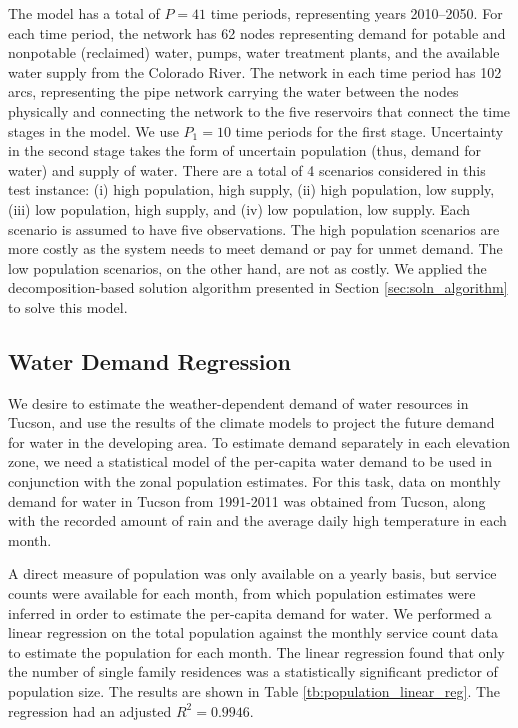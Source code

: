 \documentclass[opre,nonblindrev]{informs3} %
\begin{document}
The model has a total of $P = 41$ time periods, representing years 2010--2050.
For each time period, the network has 62 nodes representing demand for potable and nonpotable (reclaimed) water, pumps, water treatment plants, and the available water supply from the Colorado River.
The network in each time period has 102 arcs, representing the pipe network carrying the water between the nodes physically and connecting the network to the five reservoirs that connect the time stages in the model.
We use $P_1 = 10$ time periods for the first stage.
Uncertainty in the second stage takes the form of uncertain population (thus, demand for water) and supply of water.
There are a total of 4 scenarios considered in this test instance: (i) high population, high supply, (ii) high population, low supply, (iii) low population, high supply, and (iv) low population, low supply.
Each scenario is assumed to have five observations.
The high population scenarios are more costly as the system needs to meet demand or pay for unmet demand.
The low population scenarios, on the other hand, are not as costly.
We applied the decomposition-based solution algorithm presented in Section \ref{sec:soln_algorithm} to solve this model.

\subsection{Water Demand Regression}
\label{sec:model}

We desire to estimate the weather-dependent demand of water resources in Tucson, and use the results of the climate models to project the future demand for water in the developing area.
To estimate demand separately in each elevation zone, we need a statistical model of the per-capita water demand to be used in conjunction with the zonal population estimates.
For this task, data on monthly demand for water in Tucson from 1991-2011 was obtained from Tucson, along with the recorded amount of rain and the average daily high temperature in each month.

A direct measure of population was only available on a yearly basis, but service counts were available for each month, from which population estimates were inferred in order to estimate the per-capita demand for water.
We performed a linear regression on the total population against the monthly service count data to estimate the population for each month.
The linear regression found that only the number of single family residences was a statistically significant predictor of population size.
The results are shown in Table \ref{tb:population_linear_reg}.
The regression had an adjusted $R^2 = 0.9946$.
\end{document}
